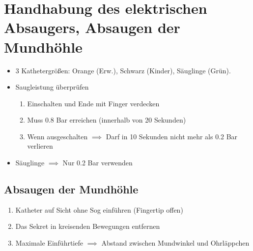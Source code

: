 \chapter{Handhabung des elektrischen Absaugers, Absaugen der Mundhöhle}
\begin{itemize}
    \item 3 Kathetergrößen: Orange (Erw.), Schwarz (Kinder), Säuglinge (Grün).
    \item Saugleistung überprüfen
          \begin{enumerate}
              \item Einschalten und Ende mit Finger verdecken
              \item Muss 0.8 Bar erreichen (innerhalb von 20 Sekunden)
              \item Wenn ausgeschalten $\implies$ Darf in 10 Sekunden nicht mehr als 0.2 Bar verlieren
          \end{enumerate}
    \item Säuglinge $\implies$ Nur 0.2 Bar verwenden
\end{itemize}
\section*{Absaugen der Mundhöhle}
\begin{enumerate}
    \item Katheter auf Sicht ohne Sog einführen (Fingertip offen)
    \item Das Sekret in kreisenden Bewegungen entfernen
    \item Maximale Einführtiefe $\implies$ Abstand zwischen Mundwinkel und Ohrläppchen
\end{enumerate}